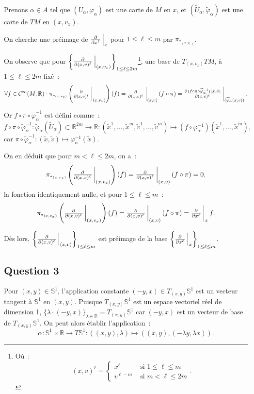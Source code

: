 \documentclass{article}
\newcommand{\R}{\mathbb R}
\begin{document}
Prenons $\alpha \in A$ tel que $(U_\alpha, \varphi_\alpha)$ est une carte de $M$ en $x$, et $(\widetilde U_\alpha, \widetilde \varphi_\alpha)$
est une carte de $TM$ en $(x, v_x)$.

On cherche une préimage de $\pd {}{{x^\ell}}\sVert[2]_{x}$ pour $1 \leq \ell \leq m$ par $\pi_{*_{(x, v_x)}}$.

On observe que pour $\left\{\pd {}{{(x, v)^\ell}}\sVert[2]_{(x, v_x)}\right\}_{1 \leq \ell \leq 2m}$\footnote{Où~:
\[(x, v)^\ell = \begin{cases}x^\ell &\text{ si } 1 \leq \ell \leq m \\v^{\ell-m} &\text{ si } m < \ell \leq 2m\end{cases}.\]}, une base de $T_{(x, v_x)}TM$,
à $1 \leq \ell \leq 2m$ fixé~:
\[\forall f \in \mathcal C^\infty(M, \R) : \pi_{*_{(x, v_x)}}\left(\pd {}{{(x, v)^\ell}}\sVert[3]_{(x, v_x)}\right)(f) =
	\pd {}{{(x, v)^\ell}}\sVert[3]_{(x, v)}\left(f \circ \pi\right) =
	\pd {(f \circ \pi \circ \widetilde \varphi_\alpha^{-1})(\tilde x, \tilde v)}{{(\tilde x, \tilde v)^\ell}}\sVert[3]_{(\widetilde \varphi_\alpha(x, v))}.\]

Or $f \circ \pi \circ \widetilde \varphi_\alpha^{-1}$ est défini comme~:
\[f \circ \pi \circ \widetilde \varphi_\alpha^{-1} : \widetilde \varphi_\alpha(\widetilde U_\alpha) \subset \R^{2m} \to \R : (\tilde x^1, \ldots, \tilde x^m, \tilde v^1, \ldots, \tilde v^m) \mapsto \left(f \circ \varphi_\alpha^{-1}\right)(\tilde x^1, \ldots, \tilde x^m),\]
car $\pi \circ \widetilde \varphi_\alpha^{-1} : (\tilde x, \tilde v) \mapsto \varphi_\alpha^{-1}(\tilde x)$.

On en déduit que pour $m < \ell \leq 2m$, on a~:
\[\pi_{*_{(x, v_x)}}\left(\pd {}{{(x, v)^\ell}}\sVert[3]_{(x, v_x)}\right)(f) = \pd {}{{(x, v)^\ell}}\sVert[3]_{(x, v)}(f \circ \pi) = 0,\]
la fonction identiquement nulle, et pour $1 \leq \ell \leq m$~:
\[\pi_{*_{(x, v_x)}}\left(\pd {}{{(x, v)^\ell}}\sVert[3]_{(x, v_x)}\right)(f) = \pd {}{{(x, v)^\ell}}\sVert[3]_{(x, v)}(f \circ \pi) = \pd {}{{x^\ell}}\sVert[3]_xf.\]

Dès lors, $\left\{\pd {}{{(x, v)^\ell}}\sVert[2]_{(x, v)}\right\}_{1 \leq \ell \leq m}$ est préimage de la base $\left\{\pd {}{{x^\ell}}\sVert[2]_x\right\}_{1 \leq \ell \leq m}$.

\subsection*{Question 3}
Pour $(x, y) \in \mathbb S^1$, l'application constante $(-y, x) \in T_{(x, y)}\mathbb S^1$ est un vecteur tangent à $\mathbb S^1$ en $(x, y)$. Puisque
$T_{(x, y)}\mathbb S^1$ est un espace vectoriel réel de dimension 1, $\{\lambda \cdot (-y, x)\}_{\lambda \in \R} = T_{(x, y)}\mathbb S^1$ car $(-y, x)$
est un vecteur de base de $T_{(x, y)}\mathbb S^1$. On peut alors établir l'application~:
\[\alpha : \mathbb S^1 \times \R \to T\mathbb S^1 : ((x, y), \lambda) \mapsto ((x, y), (-\lambda y, \lambda x)).\]
\end{document}
